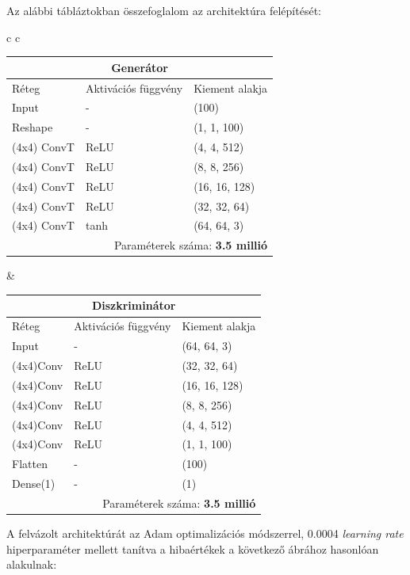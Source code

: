 Az alábbi tábláztokban összefoglalom az architektúra felépítését:
\begin{center}

\begin{tabular}{c c}

\scriptsize{
\begin{tabular}{ |p{1.7cm}|p{1.5cm}|p{1.6cm}| }
	\hline
	\multicolumn{3}{|c|}{\textbf{Generátor}} \\
	\hline
	Réteg & Aktivációs függvény & Kiement alakja\\
	\hline
	Input & - & (100)\\
	Reshape & - & (1, 1, 100)\\
	(4x4) ConvT & ReLU & (4, 4, 512)\\
	(4x4) ConvT & ReLU & (8, 8, 256)\\
	(4x4) ConvT & ReLU & (16, 16, 128)\\
	(4x4) ConvT & ReLU & (32, 32, 64)\\
	(4x4) ConvT & tanh & (64, 64, 3)\\
	\hline
	\multicolumn{3}{|r|}{Paraméterek száma: \textbf{3.5 millió}} \\
	\hline
\end{tabular}}

&\scriptsize{
\begin{tabular}{ |p{1.7cm}|p{1.5cm}|p{1.6cm}| }
	\hline
	\multicolumn{3}{|c|}{\textbf{Diszkriminátor}} \\
	\hline
	Réteg & Aktivációs függvény & Kiement alakja\\
	\hline
	Input & - & (64, 64, 3)\\
	(4x4)Conv & ReLU & (32, 32, 64)\\
	(4x4)Conv & ReLU & (16, 16, 128)\\
	(4x4)Conv & ReLU & (8, 8, 256)\\
	(4x4)Conv & ReLU & (4, 4, 512)\\
	(4x4)Conv & ReLU & (1, 1, 100)\\
	Flatten & - & (100)\\
	Dense(1) & - & (1)\\
	\hline
	\multicolumn{3}{|r|}{Paraméterek száma: \textbf{3.5 millió}} \\
	\hline
\end{tabular}}

\end{tabular}
\end{center}


A felvázolt architektúrát az Adam optimalizációs módszerrel, 0.0004 \textit{learning rate} hiperparaméter mellett tanítva a hibaértékek a következő ábrához hasonlóan alakulnak:

